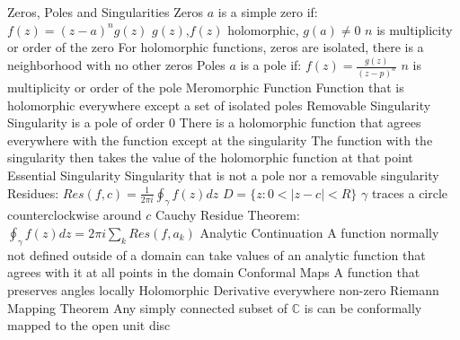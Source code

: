\documentclass[14pt]{extarticle}
\begin{document}
\begin{outline}
		\1	Zeros, Poles and Singularities
			\2	Zeros
				\3	$a$ is a simple zero if: $f(z) = (z - a)^ng(z)$
				\3	$g(z)$,$f(z)$ holomorphic, $g(a) \neq 0$
				\3	$n$ is multiplicity or order of the zero
				\3	For holomorphic functions, zeros are isolated, there is a neighborhood with no other zeros
			\2	Poles
				\3	$a$ is a pole if: $f(z) = \frac{g(z)}{(z - p)^n}$
				\3	$n$ is multiplicity or order of the pole
			\2	Meromorphic Function
				\3	Function that is holomorphic everywhere except a set of isolated poles
			\2	Removable Singularity
				\3	Singularity is a pole of order 0
				\3	There is a holomorphic function that agrees everywhere with the function except at the singularity
				\3	The function with the singularity then takes the value of the holomorphic function at that point
			\2	Essential Singularity
				\3	Singularity that is not a pole nor a removable singularity	
		\1	Residues:	$Res(f,c) = \frac{1}{2 \pi i}\oint_{\gamma} f(z)dz$
			\2	$D = \{z : 0 < |z - c| < R\}$
			\2	$\gamma$ traces a circle counterclockwise around $c$	
			\2	Cauchy Residue Theorem:	$\oint_{\gamma}f(z)dz = 2\pi i \sum_k Res(f,a_k)$
		\1	Analytic Continuation
			\2	A function normally not defined outside of a domain can take values of
					an analytic function that agrees with it at all points in the domain
		\1	Conformal Maps
			\2	A function that preserves angles locally
			\2	Holomorphic
			\2	Derivative everywhere non-zero
			\2	Riemann Mapping Theorem	
				\3 Any simply connected subset of $\mathbb{C}$ is can be conformally mapped to the open unit disc
	\end{outline}
\end{document}
